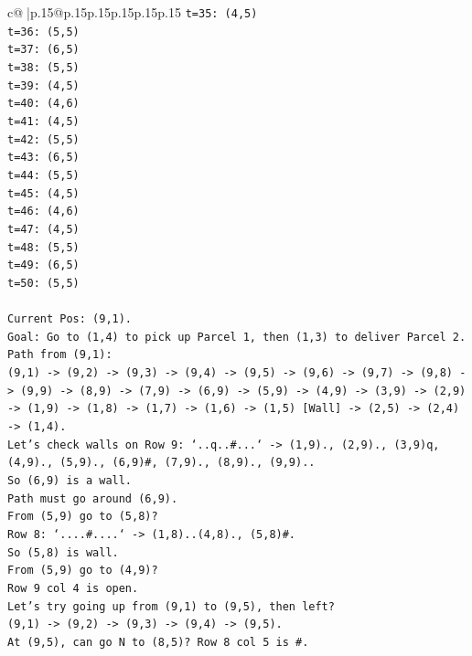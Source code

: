 \documentclass{article}
\begin{document}
{\begin{supertabular}{c@{$\;$}|p{.15\linewidth}@{}p{.15\linewidth}p{.15\linewidth}p{.15\linewidth}p{.15\linewidth}p{.15\linewidth}}
{{{\texttt{t=35: (4,5)} \\
\texttt{t=36: (5,5)} \\
\texttt{t=37: (6,5)} \\
\texttt{t=38: (5,5)} \\
\texttt{t=39: (4,5)} \\
\texttt{t=40: (4,6)} \\
\texttt{t=41: (4,5)} \\
\texttt{t=42: (5,5)} \\
\texttt{t=43: (6,5)} \\
\texttt{t=44: (5,5)} \\
\texttt{t=45: (4,5)} \\
\texttt{t=46: (4,6)} \\
\texttt{t=47: (4,5)} \\
\texttt{t=48: (5,5)} \\
\texttt{t=49: (6,5)} \\
\texttt{t=50: (5,5)} \\
\\ 
\texttt{Current Pos: (9,1).} \\
\texttt{Goal: Go to (1,4) to pick up Parcel 1, then (1,3) to deliver Parcel 2.} \\
\texttt{Path from (9,1):} \\
\texttt{(9,1) {-}> (9,2) {-}> (9,3) {-}> (9,4) {-}> (9,5) {-}> (9,6) {-}> (9,7) {-}> (9,8) {-}> (9,9) {-}> (8,9) {-}> (7,9) {-}> (6,9) {-}> (5,9) {-}> (4,9) {-}> (3,9) {-}> (2,9) {-}> (1,9) {-}> (1,8) {-}> (1,7) {-}> (1,6) {-}> (1,5) {[}Wall{]} {-}> (2,5) {-}> (2,4) {-}> (1,4).} \\
\texttt{Let's check walls on Row 9: `..q..\#...` {-}> (1,9)., (2,9)., (3,9)q, (4,9)., (5,9)., (6,9)\#, (7,9)., (8,9)., (9,9)..} \\
\texttt{So (6,9) is a wall.} \\
\texttt{Path must go around (6,9).} \\
\texttt{From (5,9) go to (5,8)?} \\
\texttt{Row 8: `....\#....` {-}> (1,8)..(4,8)., (5,8)\#.} \\
\texttt{So (5,8) is wall.} \\
\texttt{From (5,9) go to (4,9)?} \\
\texttt{Row 9 col 4 is open.} \\
\texttt{Let's try going up from (9,1) to (9,5), then left?} \\
\texttt{(9,1) {-}> (9,2) {-}> (9,3) {-}> (9,4) {-}> (9,5).} \\
\texttt{At (9,5), can go N to (8,5)? Row 8 col 5 is \#.} \\
}}}
\end{supertabular}}
\end{document}
